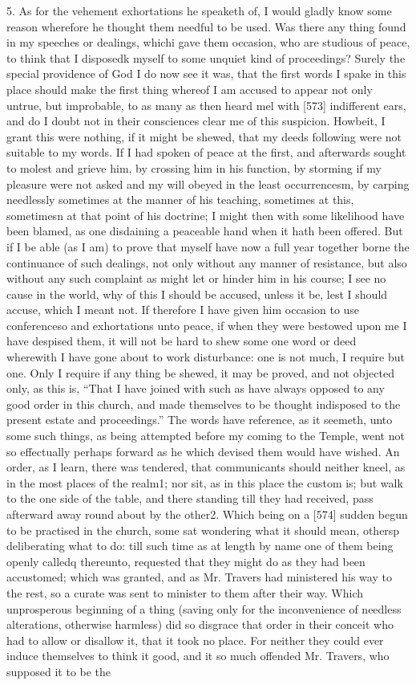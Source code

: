 5. As for the vehement exhortations he speaketh of, I would gladly know some reason wherefore he thought them needful to be used. Was there any thing found in my speeches or dealings, whichi gave them occasion, who are studious of peace, to think that I disposedk myself to some unquiet kind of proceedings? Surely the special providence of God I do now see it was, that the first words I spake in this place should make the first thing whereof I am accused to appear not only untrue, but improbable, to as many as then heard mel with [573] indifferent ears, and do I doubt not in their consciences clear me of this suspicion. Howbeit, I grant this were nothing, if it might be shewed, that my deeds following were not suitable to my words. If I had spoken of peace at the first, and afterwards sought to molest and grieve him, by crossing him in his function, by storming if my pleasure were not asked and my will obeyed in the least occurrencesm, by carping needlessly sometimes at the manner of his teaching, sometimes at this, sometimesn at that point of his doctrine; I might then with some likelihood have been blamed, as one disdaining a peaceable hand when it hath been offered. But if I be able (as I am) to prove that myself have now a full year together borne the continuance of such dealings, not only without any manner of resistance, but also without any such complaint as might let or hinder him in his course; I see no cause in the world, why of this I should be accused, unless it be, lest I should accuse, which I meant not. If therefore I have given him occasion to use conferenceso and exhortations unto peace, if when they were bestowed upon me I have despised them, it will not be hard to shew some one word or deed wherewith I have gone about to work disturbance: one is not much, I require but one. Only I require if any thing be shewed, it may be proved, and not objected only, as this is, “That I have joined with such as have always opposed to any good order in this church, and made themselves to be thought indisposed to the present estate and proceedings.” The words have reference, as it seemeth, unto some such things, as being attempted before my coming to the Temple, went not so effectually perhaps forward as he which devised them would have wished. An order, as I learn, there was tendered, that communicants should neither kneel, as in the most places of the realm1; nor sit, as in this place the custom is; but walk to the one side of the table, and there standing till they had received, pass afterward away round about by the other2. Which being on a [574] sudden begun to be practised in the church, some sat wondering what it should mean, othersp deliberating what to do: till such time as at length by name one of them being openly calledq thereunto, requested that they might do as they had been accustomed; which was granted, and as Mr. Travers had ministered his way to the rest, so a curate was sent to minister to them after their way. Which unprosperous beginning of a thing (saving only for the inconvenience of needless alterations, otherwise harmless) did so disgrace that order in their conceit who had to allow or disallow it, that it took no place. For neither they could ever induce themselves to think it good, and it so much offended Mr. Travers, who supposed it to be the 
